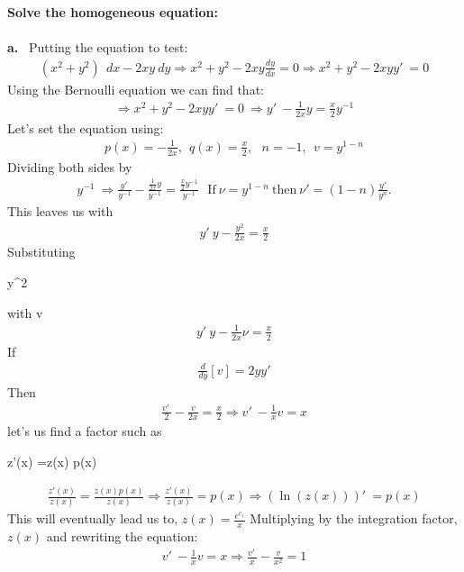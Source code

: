 \textbf{Solve the homogeneous equation:
\\\\
a. }
\ Putting the equation to test:
\begin{align}
    (x^{2}+y^{2})\ \ dx-2xy\ dy \Rightarrow x^2+y^2-2xy\frac{dy}{dx}=0  \Rightarrow
    x^2+y^2-2xyy'\:=0
\end{align}
Using the Bernoulli equation we can find that:
\begin{align}
    \Rightarrow  x^2+y^2-2xyy'\:=0 \ \Rightarrow 
y'\:-\frac{1}{2x}y=\frac{x}{2}y^{-1} 
\end{align}
Let’s set the equation using:
\begin{align}
    p\left(x\right)=-\frac{1}{2x}, \ \ q\left(x\right)=\frac{x}{2},\: \ \
n=-1,  \ \ v=y^{1-n}
\end{align}
Dividing both sides by
\begin{align}
    y^{-1} \ \Rightarrow 
\frac{y'\:}{y^{-1}}-\frac{\frac{1}{2x}y}{y^{-1}}=\frac{\frac{x}{2}y^{-1}}{y^{-1}} \ \ \
\mathrm{If\:}\nu =y^{1-n}\mathrm{\:then\:}\nu '=\left(1-n\right)\frac{y'}{y^n}.
\end{align}
This leaves us  with
\begin{align}
y'\:y-\frac{y^2}{2x}=\frac{x}{2}
\end{align}
Substituting 
\begin{justify}
y^2
\end{justify}
 with v
\begin{align}
y'\:y-\frac{1}{2x}ν=\frac{x}{2}
\end{align}
If
\begin{align}
\frac{d}{dy}[v] = 2yy'
\end{align}
Then
\begin{align}
\frac{v'\:}{2}-\frac{v}{2x}=\frac{x}{2} \Rightarrow v'\:-\frac{1}{x}v=x
\end{align}
let’s us find a factor such as 
\begin{center}
z'(x) =z(x) p(x)
\end{center}
\begin{align}
    \frac{z'\left(x\right)}{z\left(x\right)}=\frac{z\left(x\right)p\left(x\right)}{
z\left(x\right)} \Rightarrow \frac{
z'\left(x\right)}{z\left(x\right)}=p\left(x\right) 
\Rightarrow 
\left(\ln \left(z\left(x\right)\right)\right)'\:=p\left(x\right)
\end{align}
This will eventually lead us to, $z\left(x\right)=\frac{e^{c_1}}{x}$
Multiplying by the integration factor, $z(x)$ and rewriting the equation:
\begin{align}
    v'\:-\frac{1}{x}v=x 
\Rightarrow 
\frac{v'\:}{x}-\frac{v}{x^2}=1
\end{align}
